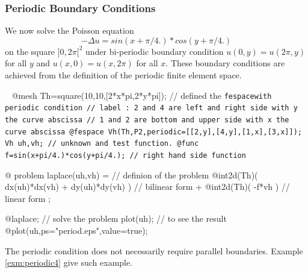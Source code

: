 \documentclass[a4paper,twoside,12pt]{book}
\begin{document}
\subsubsection{Periodic Boundary Conditions }
We now solve the Poisson equation
$$ -\Delta u= sin(x+\pi/4.)*cos(y+\pi/4.)$$ on
the square $]0,2\pi[^2$
under bi-periodic boundary condition
$u(0,y)=u(2\pi,y)$ for all $y$ and
$u(x,0)=u(x,2\pi)$ for all $x$.
These boundary conditions are achieved from the definition
of the periodic finite element space.

\begin{example}~
\label{exm:periodic}
\bFF
@mesh Th=square(10,10,[2*x*pi,2*y*pi]);
// defined the \bgroup\tt fespace\egroup  with periodic condition
//    label :  2 and 4  are left and right   side with y the curve abscissa
//             1 and 2  are bottom and upper side with x the curve abscissa
@fespace Vh(Th,P2,periodic=[[2,y],[4,y],[1,x],[3,x]]);
 Vh uh,vh;              // unknown and test function.
 @func f=sin(x+pi/4.)*cos(y+pi/4.);      //  right hand side function

@ problem laplace(uh,vh) =                      //  definion of  the problem
    @int2d(Th)( dx(uh)*dx(vh) + dy(uh)*dy(vh) ) //  bilinear form
  + @int2d(Th)( -f*vh )                         //  linear form
;

  @laplace; // solve the problem plot(uh); // to see the result
  @plot(uh,ps="period.eps",value=true);
\eFF
{}
\end{example}

The periodic condition does not necessarily require
parallel boundaries. Example \ref{exm:periodic4}
 give such example.
\end{document}
